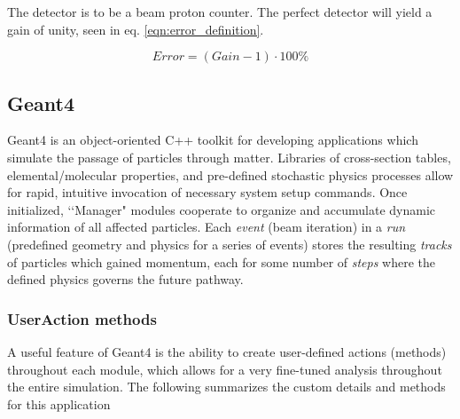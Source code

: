 \documentclass{mc2015}
\begin{document}
The detector is to be a beam proton counter. The perfect detector will yield a gain of unity, seen in eq. \ref{eqn:error_definition}.

\begin{equation}
Error = (Gain-1)\cdot100\%
\label{eqn:error_definition}
\end{equation}

\subsection{Geant4}

Geant4 is an object-oriented C++ toolkit for developing applications which simulate the passage of particles through matter. Libraries of cross-section tables, elemental/molecular properties, and pre-defined stochastic physics processes allow for rapid, intuitive invocation of necessary system setup commands. Once initialized, \lq\lq Manager" modules cooperate to organize and accumulate dynamic information of all affected particles.  Each \emph{event} (beam iteration) in a \emph{run} (predefined geometry and physics for a series of events) stores the resulting \emph{tracks} of particles which gained momentum, each for some number of \emph{steps} where the defined physics governs the future pathway.

\subsubsection{UserAction methods}

A useful feature of Geant4 is the ability to create user-defined actions (methods) throughout each module, which allows for a very fine-tuned analysis throughout the entire simulation.  The following summarizes the custom details and methods for this application
\end{document}
